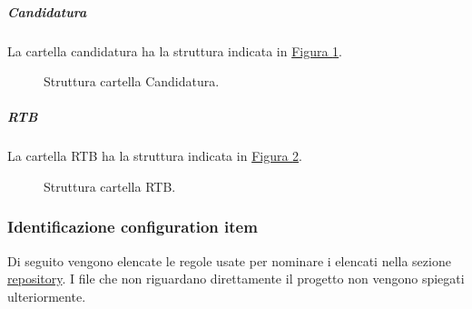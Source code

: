 \subparagraph{Candidatura}
La cartella candidatura ha la struttura indicata in \hyperref[fig:repo_sorgenti_documenti_candidatura]{Figura \ref{fig:repo_sorgenti_documenti_candidatura}}.
\begin{figure}[!h]
    \caption{Struttura cartella Candidatura.}
    \label{fig:repo_sorgenti_documenti_candidatura}
\end{figure}

\subparagraph{RTB}
La cartella RTB ha la struttura indicata in \hyperref[fig:repo_sorgenti_documenti_RTB]{Figura \ref{fig:repo_sorgenti_documenti_RTB}}.
\begin{figure}[!h]
    \caption{Struttura cartella RTB.}
    \label{fig:repo_sorgenti_documenti_RTB}
\end{figure}

\subsubsection{Identificazione configuration item}
\label{subsubsec:identificazione_CI}
Di seguito vengono elencate le regole usate per nominare i  elencati nella sezione \hyperref[subsubsec:repository]{repository}.
I file che non riguardano direttamente il progetto non vengono spiegati ulteriormente. 

